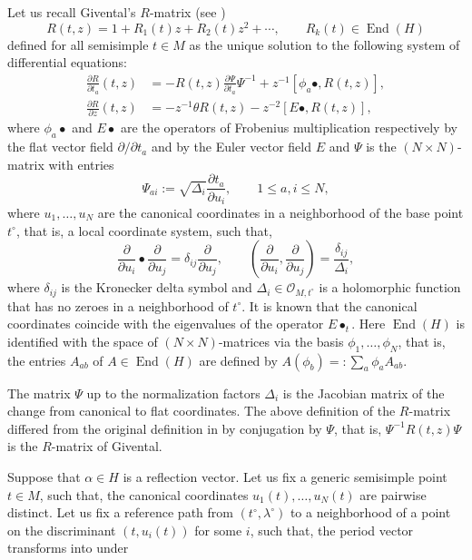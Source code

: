 \documentclass[pdftex]{sigma}
\numberwithin{equation}{section}
\renewcommand{\O}{\mathcal{O}}
\begin{document}
Let us recall Givental's $R$-matrix (see \cite{Givental:qqh})
\[
R(t,z)=1+R_1(t) z+R_2(t) z^2+\cdots,\qquad
R_k(t)\in \operatorname{End}(H)
\]
defined for all semisimple $t\in M$ as the unique solution to the
following system of differential equations:
\begin{align*}
\frac{\partial R}{\partial t_a} (t,z) & = -
R(t,z) \frac{\partial \Psi}{\partial t_a} \Psi^{-1} +
 z^{-1}[\phi_a\bullet,R(t,z)],\\
\frac{\partial R}{\partial z} (t,z) & = -
z^{-1}\theta R(t,z) -
z^{-2} [E\bullet, R(t,z)],
\end{align*}
where $\phi_a\bullet$ and $E\bullet$ are the operators of Frobenius
multiplication respectively by the flat vector field
$\partial/\partial t_a$ and by the Euler vector field $E$ and $\Psi$ is
the $(N\times N)$-matrix with entries
\[
\Psi_{ai}:= \sqrt{\Delta_i} \frac{\partial t_a}{\partial u_i},
\qquad
1\leq a,i\leq N,
\]
where $u_1,\dots,u_N$ are the canonical coordinates in a neighborhood
of the base point $t^\circ$, that is, a local coordinate system, such that,
\[
\frac{\partial}{\partial u_i} \bullet \frac{\partial}{\partial u_j} =
\delta_{ij} \frac{\partial}{\partial u_j},\qquad
\left( \frac{\partial}{\partial u_i},\frac{\partial}{\partial
 u_j}\right)=
\frac{\delta_{ij}}{\Delta_{i}},
\]
where $\delta_{ij} $ is the Kronecker delta symbol and $\Delta_i\in
\O_{M,t^\circ}$ is a holomorphic function that has no zeroes in a
neighborhood of $t^\circ$. It is known that the canonical coordinates
coincide with the eigenvalues of the operator $E\bullet_t$.
Here $\operatorname{End}(H)$ is identified with the space of $(N\times
N)$-matrices via the basis $\phi_1,\dots,\phi_N$, that is, the
entries $A_{ab}$ of $A\in \operatorname{End}(H)$ are defined by
$A(\phi_b)=:\sum_a \phi_a A_{ab}$.
\begin{Remark}
The matrix $\Psi$ up to the normalization factors $\Delta_i$ is the
Jacobian matrix of the change from canonical to flat coordinates. The
above definition of the $R$-matrix differed from the original
definition in \cite{Givental:qqh} by conjugation by $\Psi$, that is,
$\Psi^{-1}R(t,z)\Psi$ is the $R$-matrix of Givental.
\end{Remark}
Suppose that $\alpha \in H$ is a reflection vector. Let us fix a generic
semisimple point $t\in M$, such that, the canonical coordinates
$u_1(t),\dots,u_N(t)$
are pairwise distinct. Let us fix a reference path from
$(t^\circ,\lambda^\circ)$ to a neighborhood of a point on the
discriminant $(t,u_i(t))$ for some $i$, such that, the period vector
 transforms into  under
\end{document}
